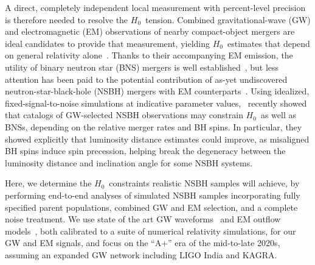 \documentclass[%
 reprint,
 superscriptaddress,
 nofootinbib,
 amsmath,amssymb,
 aps,
]{revtex4-2}
\newcommand{\hubble}{\ensuremath{H_0}}
\begin{document}
A direct, completely independent local measurement with percent-level precision is therefore needed to resolve the \hubble\ tension. Combined gravitational-wave (GW) and electromagnetic (EM) observations of nearby compact-object mergers are ideal candidates to provide that measurement, yielding \hubble\ estimates that depend on general relativity alone~\cite{Schutz:1986,Holz_Hughes:2005,Dalal:2006,Nissanke_etal:2010,Taylor_etal:2012,Messenger_Read:2012,Nissanke_etal:2013,Oguri:2016,delPozzo:2017,Abbott_etal:2017a,Seto:2018,Chen_etal:2018,Fishbach_etal:2018,Feeney_etal:2018,Mortlock_etal:2019,Gray_etal:2019,Soares-Santos_etal:2019,Palmese_etal:2020,Mukherjee_Wandelt:2018,Mukherjee_etal:2020a,Vasylyev_Filippenko:2020,Chen_etal:2020,Gayathri_etal:2020,Mukherjee_etal:2020b}. Thanks to their accompanying EM emission, the utility of binary neutron star (BNS) mergers is well established~\cite{Dalal:2006,Nissanke_etal:2010,Taylor_etal:2012,Messenger_Read:2012,Nissanke_etal:2013,Oguri:2016,delPozzo:2017,Abbott_etal:2017a,Seto:2018,Chen_etal:2018,Fishbach_etal:2018,Feeney_etal:2018,Mortlock_etal:2019,Gray_etal:2019}, but less attention has been paid to the potential contribution of as-yet undiscovered neutron-star-black-hole (NSBH) mergers with EM counterparts~\cite{Nissanke_etal:2010,Nissanke_etal:2013,Vitale_Chen:2018}. Using idealized, fixed-signal-to-noise simulations at indicative parameter values,~\citet{Vitale_Chen:2018} recently showed that catalogs of GW-selected NSBH observations may constrain \hubble\ as well as BNSs, depending on the relative merger rates and BH spins. In particular, they showed explicitly that luminosity distance estimates could improve, as misaligned BH spins induce spin precession, helping break the degeneracy between the luminosity distance and inclination angle for some NSBH systems.

Here, we determine the \hubble\ constraints realistic NSBH samples will achieve, by performing end-to-end analyses of simulated NSBH samples incorporating fully specified parent populations, combined GW and EM selection, and a complete noise treatment. We use state of the art GW waveforms~\cite{Dietrich_etal:2019, Matas_etal:2020} and EM outflow models~\cite{Foucart_etal:2018}, both calibrated to a suite of numerical relativity simulations, for our GW and EM signals, and focus on the ``A+'' era of the mid-to-late 2020s, assuming an expanded GW network including LIGO India and KAGRA.

\end{document}
